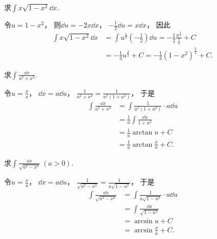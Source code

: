 \begin{example}
求\(\int x \sqrt{1-x^2} \dd{x}\).
\begin{solution}
令\(u=1-x^2\)，
则\(\dd{u} = -2x\dd{x}\)，
\(-\frac{1}{2}\dd{u} = x\dd{x}\)，
因此\begin{align*}
	\int x \sqrt{1-x^2} \dd{x}
	&= \int u^{\frac{1}{2}} \left(-\frac{1}{2}\right) \dd{u}
	= -\frac{1}{2} \frac{u^{\frac{3}{2}}}{\frac{3}{2}} + C \\
	&= -\frac{1}{3} u^{\frac{3}{2}} + C
	= -\frac{1}{3} (1-x^2)^{\frac{3}{2}} + C.
\end{align*}
\end{solution}
\end{example}

\begin{example}
求\(\int \frac{\dd{x}}{a^2+x^2}\).
\begin{solution}
令\(u=\frac{x}{a}\)，
\(\dd{x}=a\dd{u}\)，
\(\frac{1}{a^2+x^2}
= \frac{1}{a^2(1+u^2)}\)，
于是\begin{align}
	\int \frac{\dd{x}}{a^2+x^2}
	&= \int \frac{1}{a^2(1+u^2)} \cdot a\dd{u}
		\nonumber \\
	&= \frac{1}{a} \int \frac{\dd{u}}{1+u^2}
		\nonumber \\
	&= \frac{1}{a} \arctan u + C
		\nonumber \\
	&= \frac{1}{a} \arctan\frac{x}{a} + C.
\end{align}
\end{solution}
\end{example}

\begin{example}
求\(\int \frac{\dd{x}}{\sqrt{a^2-x^2}}\ (a>0)\).
\begin{solution}
令\(u=\frac{x}{a}\)，
\(\dd{x}=a\dd{u}\)，
\(\frac{1}{\sqrt{a^2-x^2}}
= \frac{1}{a\sqrt{1-u^2}}\)，
于是\begin{align}
	\int \frac{\dd{x}}{\sqrt{a^2-x^2}}
	&= \int \frac{1}{a\sqrt{1-u^2}} \cdot a\dd{u}
		\nonumber \\
	&= \int \frac{\dd{u}}{\sqrt{1-u^2}}
		\nonumber \\
	&= \arcsin u + C
		\nonumber \\
	&= \arcsin\frac{x}{a} + C.
\end{align}
\end{solution}
\end{example}


